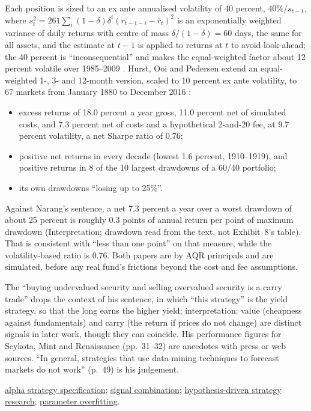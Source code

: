 \begin{qfdefinition}
Each position is sized to an ex ante annualised volatility of 40 percent, $40\%/s_{t-1}$, where $s^2_t=261\sum_i(1-\delta)\delta^i(r_{t-1-i}-\bar r_t)^2$ is an exponentially weighted variance of daily returns with centre of mass $\delta/(1-\delta)=60$ days, the same for all assets, and the estimate at $t-1$ is applied to returns at $t$ to avoid look-ahead; the 40 percent is ``inconsequential'' and makes the equal-weighted factor about 12 percent volatile over 1985--2009 \citep[secs.~2.4 and~4.1, eq.~(1), pp.~233 and~236]{s6-tsmom}. Hurst, Ooi and Pedersen extend an equal-weighted 1-, 3- and 12-month version, scaled to 10 percent ex ante volatility, to 67 markets from January 1880 to December 2016 \citep[reprint PDF pp.~3--7, Exhibit~1 on PDF p.~4]{alpha-century}:
\begin{itemize}
\item excess returns of 18.0 percent a year gross, 11.0 percent net of simulated costs, and 7.3 percent net of costs and a hypothetical 2-and-20 fee, at 9.7 percent volatility, a net Sharpe ratio of 0.76;
\item positive net returns in every decade (lowest 1.6 percent, 1910--1919), and positive returns in 8 of the 10 largest drawdowns of a 60/40 portfolio;
\item its own drawdowns ``losing up to 25\%''.
\end{itemize}
Against Narang's sentence, a net 7.3 percent a year over a worst drawdown of about 25 percent is roughly 0.3 points of annual return per point of maximum drawdown (Interpretation; drawdown read from the text, not Exhibit~8's table). That is consistent with ``less than one point'' on that measure, while the volatility-based ratio is 0.76. Both papers are by AQR principals and are simulated, before any real fund's frictions beyond the cost and fee assumptions.

The ``buying undervalued security and selling overvalued security is a carry trade'' drops the context of his sentence, in which ``this strategy'' is the yield strategy, so that the long earns the higher yield; interpretation: value (cheapness against fundamentals) and carry (the return if prices do not change) are distinct signals in later work, though they can coincide. His performance figures for Seykota, Mint and Renaissance (pp.~31--32) are anecdotes with press or web sources. ``In general, strategies that use data-mining techniques to forecast markets do not work'' (p.~49) is his judgement.

 \hyperref[meth:alpha-strategy-specification]{alpha strategy specification}; \hyperref[meth:alpha-signal-combination]{signal combination}; \hyperref[meth:hypothesis-driven-strategy-research]{hypothesis-driven strategy research}; \hyperref[pit:parameter-overfitting]{parameter overfitting}.

\end{qfdefinition}

